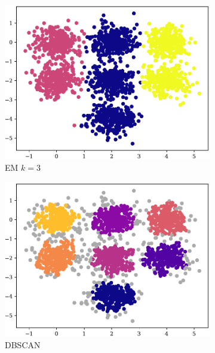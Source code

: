 \begin{figure}[t!]
\begin{subfigure}[b]{0.45\textwidth}
        \includegraphics[width=\textwidth]{../plots/7-3_pred_em.pdf}
        \caption{EM $k = 3$}
        \label{subfig:7-3-em}
    \end{subfigure}
    \hspace{0.09\textwidth}
    \begin{subfigure}[b]{0.45\textwidth}
        \includegraphics[width=\textwidth]{../plots/7-3_pred_dbscan.pdf}
        \caption{DBSCAN}
        \label{subfig:7-3-dbscan}
    \end{subfigure}
    \begin{subfigure}[b]{0.45\textwidth}

\end{subfigure}
\end{figure}
